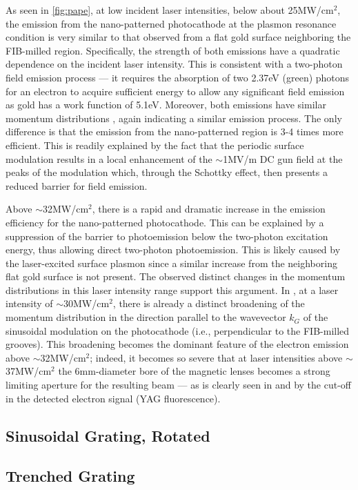 As seen in \ref{fig:pape}, at low incident laser intensities, below about 25MW/cm$^2$, the emission from the nano-patterned photocathode at the plasmon resonance condition is very similar to that observed from a flat gold surface neighboring the FIB-milled region.
Specifically, the strength of both emissions have a quadratic dependence on the incident laser intensity.
This is consistent with a two-photon field emission process --- it requires the absorption of two 2.37eV (green) photons for an electron to acquire sufficient energy to allow any significant field emission as gold has a work function of 5.1eV.
Moreover, both emissions have similar momentum distributions , again indicating a similar emission process.
The only difference is that the emission from the nano-patterned region is 3-4 times more efficient.
This is readily explained by the fact that the periodic surface modulation results in a local enhancement of the $\sim$1MV/m DC gun field at the peaks of the modulation which, through the Schottky effect, then presents a reduced barrier for field emission.

Above $\sim$32MW/cm$^2$, there is a rapid and dramatic increase in the emission efficiency for the nano-patterned photocathode.
This can be explained by a suppression of the barrier to photoemission below the two-photon excitation energy, thus allowing direct two-photon photoemission.
This is likely caused by the laser-excited surface plasmon since a similar increase from the neighboring flat gold surface is not present.
The observed distinct changes in the momentum distributions  in this laser intensity range support this argument.
In , at a laser intensity of $\sim$30MW/cm$^2$, there is already a distinct broadening of the momentum distribution in the direction parallel to the wavevector $k_G$ of the sinusoidal modulation on the photocathode (i.e., perpendicular to the FIB-milled grooves). 
This broadening becomes the dominant feature of the electron emission above $\sim$32MW/cm$^2$; indeed, it becomes so severe that at laser intensities above $\sim$37MW/cm$^2$ the 6mm-diameter bore of the magnetic lenses becomes a strong limiting aperture for the resulting beam --- as is clearly seen in  and by the cut-off in the detected electron signal (YAG fluorescence).

\subsection{Sinusoidal Grating, Rotated}

\begin{figure}
  \centering
  
  \caption{}
\end{figure}

\subsection{Trenched Grating}
